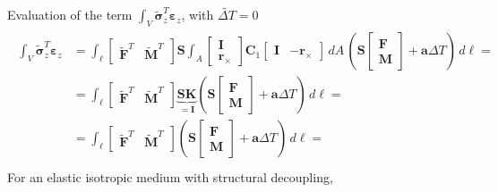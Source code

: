 \documentclass[letterpaper,10pt,english]{jupyterBook}
\begin{document}
\sphinxAtStartPar
Evaluation of the term \(\int_{V} \widetilde{\boldsymbol\sigma}_z^T \boldsymbol\varepsilon_z\), with \(\widetilde{\Delta T} = 0\)
\begin{equation*}
\begin{split}\begin{aligned}
  \int_V \widetilde{\boldsymbol\sigma}_z^T \boldsymbol\varepsilon_z 
  & = \int_{\ell} \begin{bmatrix} \widetilde{\mathbf{F}}^T & \widetilde{\mathbf{M}}^T \end{bmatrix} \mathbf{S} \int_{A} \begin{bmatrix} \mathbf{I} \\ \mathbf{r}_{\times} \end{bmatrix} \mathbf{C}_1 \begin{bmatrix} \mathbf{I} & - \mathbf{r}_{\times} \end{bmatrix} \, dA \, \left( \mathbf{S} \begin{bmatrix} \mathbf{F} \\ \mathbf{M} \end{bmatrix} + \mathbf{a} \Delta T \right) \, d \ell = \\
  & = \int_{\ell} \begin{bmatrix} \widetilde{\mathbf{F}}^T & \widetilde{\mathbf{M}}^T \end{bmatrix} \underbrace{\mathbf{S} \mathbf{K}}_{= \mathbf{I}}  \left( \mathbf{S} \begin{bmatrix} \mathbf{F} \\ \mathbf{M} \end{bmatrix} + \mathbf{a} \Delta T \right) \, d \ell = \\
  & = \int_{\ell} \begin{bmatrix} \widetilde{\mathbf{F}}^T & \widetilde{\mathbf{M}}^T \end{bmatrix} \left( \mathbf{S} \begin{bmatrix} \mathbf{F} \\ \mathbf{M} \end{bmatrix} + \mathbf{a} \Delta T \right) \, d \ell = \\
\end{aligned}\end{split}
\end{equation*}
\sphinxAtStartPar
For an elastic isotropic medium with structural decoupling,
\end{document}
